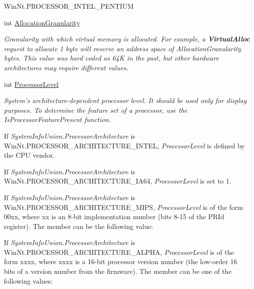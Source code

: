 \begin{DoxyCompactItemize}
\begin{DoxyCompactList}
WinNt.PROCESSOR\_\-INTEL\_\-PENTIUM \item\end{DoxyCompactList}\item 
int \hyperlink{struct_tao_1_1_platform_1_1_windows_1_1_kernel_1_1_s_y_s_t_e_m___i_n_f_o_a4c5fa3e71d82e4ba21014707b3cf0f53}{AllocationGranularity}
\begin{DoxyCompactList}\small\item\em Granularity with which virtual memory is allocated. For example, a {\bfseries VirtualAlloc} request to allocate 1 byte will reserve an address space of {\itshape AllocationGranularity\/} bytes. This value was hard coded as 64K in the past, but other hardware architectures may require different values. \item\end{DoxyCompactList}\item 
int \hyperlink{struct_tao_1_1_platform_1_1_windows_1_1_kernel_1_1_s_y_s_t_e_m___i_n_f_o_a52a0d3b28f7fc40b45377a30f13ebebe}{ProcessorLevel}
\begin{DoxyCompactList}\small\item\em System's architecture-\/dependent processor level. It should be used only for display purposes. To determine the feature set of a processor, use the IsProcessorFeaturePresent function. 

If {\itshape SystemInfoUnion.ProcessorArchitecture\/} is WinNt.PROCESSOR\_\-ARCHITECTURE\_\-INTEL, {\itshape ProcessorLevel\/} is defined by the CPU vendor. 

If {\itshape SystemInfoUnion.ProcessorArchitecture\/} is WinNt.PROCESSOR\_\-ARCHITECTURE\_\-IA64, {\itshape ProcessorLevel\/} is set to 1. 

If {\itshape SystemInfoUnion.ProcessorArchitecture\/} is WinNt.PROCESSOR\_\-ARCHITECTURE\_\-MIPS, {\itshape ProcessorLevel\/} is of the form 00xx, where xx is an 8-\/bit implementation number (bits 8-\/15 of the PRId register). The member can be the following value: 

\begin{TabularC}{2}
\hline
Value} &Description  \\\cline{1-2}
0004} &MIPS R4000  \\\cline{1-2}
\end{TabularC}


If {\itshape SystemInfoUnion.ProcessorArchitecture\/} is WinNt.PROCESSOR\_\-ARCHITECTURE\_\-ALPHA, {\itshape ProcessorLevel\/} is of the form xxxx, where xxxx is a 16-\/bit processor version number (the low-\/order 16 bits of a version number from the firmware). The member can be one of the following values: 


\end{DoxyCompactList}
\end{DoxyCompactItemize}

